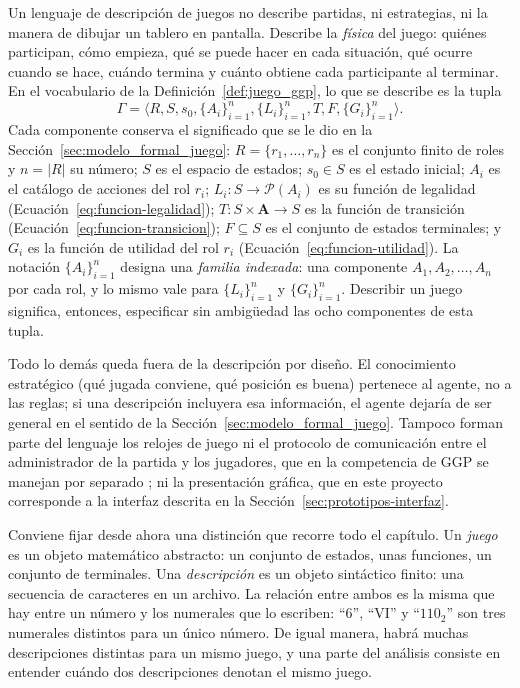 Un lenguaje de descripción de juegos no describe partidas, ni estrategias, ni la manera de dibujar un tablero en pantalla. Describe la \emph{física} del juego: quiénes participan, cómo empieza, qué se puede hacer en cada situación, qué ocurre cuando se hace, cuándo termina y cuánto obtiene cada participante al terminar. En el vocabulario de la Definición~\ref{def:juego_ggp}, lo que se describe es la tupla
\begin{equation}
    \Gamma = \langle R, S, s_0, \{A_i\}_{i=1}^n, \{L_i\}_{i=1}^n, T, F, \{G_i\}_{i=1}^n \rangle .
    \label{eq:an_gamma}
\end{equation}
Cada componente conserva el significado que se le dio en la Sección~\ref{sec:modelo_formal_juego}: $R = \{r_1, \dots, r_n\}$ es el conjunto finito de roles y $n = |R|$ su número; $S$ es el espacio de estados; $s_0 \in S$ es el estado inicial; $A_i$ es el catálogo de acciones del rol $r_i$; $L_i : S \to \mathcal P(A_i)$ es su función de legalidad (Ecuación~\eqref{eq:funcion-legalidad}); $T : S \times \mathbf A \to S$ es la función de transición (Ecuación~\eqref{eq:funcion-transicion}); $F \subseteq S$ es el conjunto de estados terminales; y $G_i$ es la función de utilidad del rol $r_i$ (Ecuación~\eqref{eq:funcion-utilidad}). La notación $\{A_i\}_{i=1}^n$ designa una \emph{familia indexada}: una componente $A_1, A_2, \dots, A_n$ por cada rol, y lo mismo vale para $\{L_i\}_{i=1}^n$ y $\{G_i\}_{i=1}^n$. Describir un juego significa, entonces, especificar sin ambigüedad las ocho componentes de esta tupla.

Todo lo demás queda fuera de la descripción por diseño. El conocimiento estratégico (qué jugada conviene, qué posición es buena) pertenece al agente, no a las reglas; si una descripción incluyera esa información, el agente dejaría de ser general en el sentido de la Sección~\ref{sec:modelo_formal_juego}. Tampoco forman parte del lenguaje los relojes de juego ni el protocolo de comunicación entre el administrador de la partida y los jugadores, que en la competencia de GGP se manejan por separado \cite{Genesereth2005GGP}; ni la presentación gráfica, que en este proyecto corresponde a la interfaz descrita en la Sección~\ref{sec:prototipos-interfaz}.

Conviene fijar desde ahora una distinción que recorre todo el capítulo. Un \emph{juego} es un objeto matemático abstracto: un conjunto de estados, unas funciones, un conjunto de terminales. Una \emph{descripción} es un objeto sintáctico finito: una secuencia de caracteres en un archivo. La relación entre ambos es la misma que hay entre un número y los numerales que lo escriben: ``$6$'', ``$\mathrm{VI}$'' y ``$110_2$'' son tres numerales distintos para un único número. De igual manera, habrá muchas descripciones distintas para un mismo juego, y una parte del análisis consiste en entender cuándo dos descripciones denotan el mismo juego.

